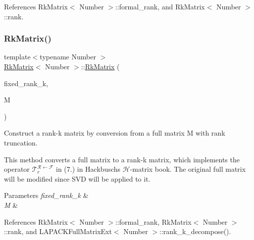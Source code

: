 References Rk\+Matrix$<$ Number $>$\+::formal\+\_\+rank, and Rk\+Matrix$<$ Number $>$\+::rank.

\mbox{\label{classRkMatrix_a6078a6d21d37f140ff8774b8310a19eb}} 
\subsubsection{\texorpdfstring{Rk\+Matrix()}{RkMatrix()}\hspace{0.1cm}{\footnotesize\ttfamily [3/18]}}
{\footnotesize\ttfamily template$<$typename Number $>$ \\
\hyperlink{classRkMatrix}{Rk\+Matrix}$<$ Number $>$\+::\hyperlink{classRkMatrix}{Rk\+Matrix} (\begin{DoxyParamCaption}\item[{const \hyperlink{classRkMatrix_add060bfc3a4cc77f858c3d6dd58cadd5}{size\+\_\+type}}]{fixed\+\_\+rank\+\_\+k,  }\item[{\hyperlink{classLAPACKFullMatrixExt}{L\+A\+P\+A\+C\+K\+Full\+Matrix\+Ext}$<$ Number $>$ \&}]{M }\end{DoxyParamCaption})}

Construct a rank-\/k matrix by conversion from a full matrix {\ttfamily M} with rank truncation.


\begin{DoxyDescription}
\item[Note ]This method converts a full matrix to a rank-\/k matrix, which implements the operator $\mathcal{T}_{r}^{\mathcal{R} \leftarrow \mathcal{F}}$ in (7.) in Hackbusch\textquotesingle{}s $\mathcal{H}$-\/matrix book. The original full matrix {\ttfamily will} be modified since S\+VD will be applied to it. 
\end{DoxyDescription}
\begin{DoxyParams}{Parameters}
{\em fixed\+\_\+rank\+\_\+k} & \\
\hline
{\em M} & \\
\hline
\end{DoxyParams}


References Rk\+Matrix$<$ Number $>$\+::formal\+\_\+rank, Rk\+Matrix$<$ Number $>$\+::rank, and L\+A\+P\+A\+C\+K\+Full\+Matrix\+Ext$<$ Number $>$\+::rank\+\_\+k\+\_\+decompose().

\mbox{\label{classRkMatrix_a08ab45361d9e3cca139727dca31f9bfa}} 

